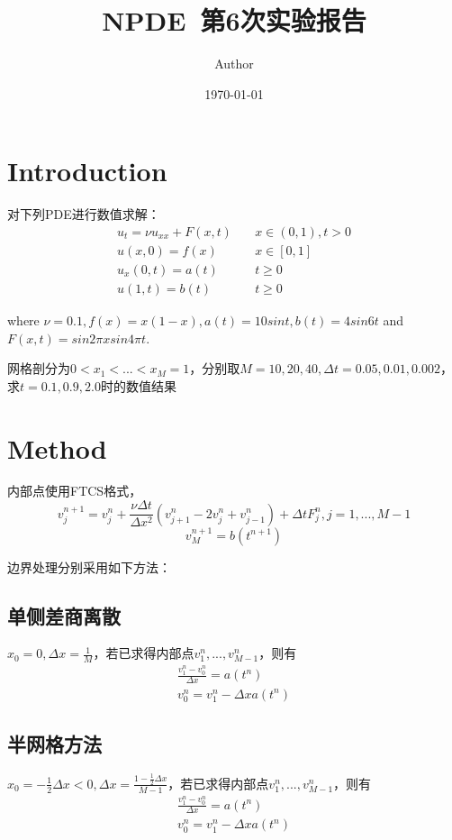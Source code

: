 \documentclass{article}
\title{NPDE~第6次实验报告}
\author{Author}
\date{\today}
\begin{document}
\maketitle

\section{Introduction}
对下列PDE进行数值求解：
\begin{equation*}
    \begin{aligned}
        u_t=\nu u_{xx}+F(x,t)&\quad x\in (0,1),t>0\\
        u(x,0)=f(x)&\quad x\in [0,1]\\
        u_x(0,t)=a(t)&\quad t\geq 0\\
        u(1,t)=b(t)&\quad t\geq 0
    \end{aligned}
\end{equation*}

where $\nu = 0.1, f(x) = x(1 - x), a(t) = 10 sin t, b(t) = 4sin 6t$ and $ F(x, t) =
sin 2\pi x sin 4\pi t$.

网格剖分为$0<x_1<...<x_M=1$，分别取$M=10,20,40,\Delta t=0.05,0.01,0.002$，求$t=0.1,0.9,2.0$时的数值结果
\section{Method}
内部点使用FTCS格式，
$$v_{j}^{n+1} = v_{j}^{n} + \frac{\nu \Delta t}{\Delta x^2}(v_{j+1}^{n} - 2v_{j}^{n} + v_{j-1}^{n}) + \Delta t F_{j}^{n}, j=1,...,M-1$$
$$v_M^{n+1} = b(t^{n+1})$$

边界处理分别采用如下方法：
\subsection{单侧差商离散}
$x_0=0, \Delta x=\frac{1}{M}$，若已求得内部点$v_1^n,...,v_{M-1}^n$，则有
\begin{equation*}
    \begin{aligned}
        \frac{v_1^n-v_0^n}{\Delta x}=a(t^n)\\
        v_0^n=v_1^n-\Delta x a(t^n)
    \end{aligned}
\end{equation*}
\subsection{半网格方法}
$x_0=-\frac{1}{2}\Delta x<0, \Delta x=\frac{1-\frac{1}{2}\Delta x}{M-1}$，若已求得内部点$v_1^n,...,v_{M-1}^n$，则有
\begin{equation*}
    \begin{aligned}
        \frac{v_1^n-v_0^n}{\Delta x}=a(t^n)\\
        v_0^n=v_1^n-\Delta x a(t^n)
    \end{aligned}
\end{equation*}
\end{document}
